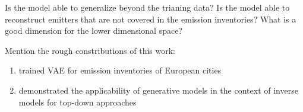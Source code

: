 Is the model able to generalize beyond the trianing data?
Is the model able to reconstruct emitters that are not covered in the emission inventories? 
What is a good dimension for the lower dimensional space?

Mention the rough constributions of this work:
\begin{enumerate}
    \item trained VAE for emission inventories of European cities
    \item demonstrated the applicability of generative models in the context of inverse models for top-down approaches
\end{enumerate}
